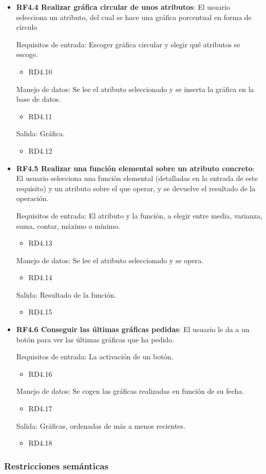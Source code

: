 \begin{itemize}
	\item \textbf{RF4.4 Realizar gráfica circular de unos atributos}: El usuario selecciona un atributo, del cual se hace una gráfica porcentual en forma de círculo
	
	Requisitos de entrada: Escoger gráfica circular y elegir qué atributos se escoge.
	\begin{itemize}
		\item RD4.10
	\end{itemize}
	Manejo de datos: Se lee el atributo seleccionado y se inserta la gráfica en la base de datos.
	\begin{itemize}
		\item RD4.11
	\end{itemize}
	Salida: Gráfica.
	\begin{itemize}
		\item RD4.12
	\end{itemize}
	
	\item \textbf{RF4.5 Realizar una función elemental sobre un atributo concreto}: El usuario selecciona una función elemental (detalladas en la entrada de este requisito) y un atributo sobre el que operar, y se devuelve el resultado de la operación.
	
	Requisitos de entrada: El atributo y la función, a elegir entre media, varianza, suma, contar, máximo o mínimo.
	\begin{itemize}
		\item RD4.13
	\end{itemize}
	Manejo de datos: Se lee el atributo seleccionado y se opera.
	\begin{itemize}
		\item RD4.14
	\end{itemize}
	Salida: Resultado de la función.
	\begin{itemize}
		\item RD4.15
	\end{itemize}
	
	\item \textbf{RF4.6 Conseguir las últimas gráficas pedidas}: El usuario le da a un botón para ver las últimas gráficas que ha pedido.
	
	Requisitos de entrada: La activación de un botón.
	\begin{itemize}
		\item RD4.16
	\end{itemize}
	Manejo de datos: Se cogen las gráficas realizadas en función de su fecha.
	\begin{itemize}
		\item RD4.17
	\end{itemize}
	Salida: Gráficas, ordenadas de más a menos recientes.
	\begin{itemize}
		\item RD4.18
	\end{itemize}
	
\end{itemize}

\subsubsection{Restricciones semánticas}